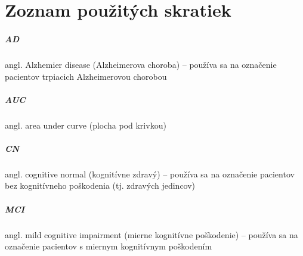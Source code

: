 \chapter*{Zoznam použitých skratiek}

\paragraph{AD} angl. Alzhemier disease (Alzheimerova choroba) -- používa sa na označenie pacientov trpiacich Alzheimerovou chorobou
\paragraph{AUC} angl. area under curve (plocha pod krivkou)
\paragraph{CN} angl. cognitive normal (kognitívne zdravý) -- používa sa na označenie pacientov bez kognitívneho poškodenia (tj. zdravých jedincov)
\paragraph{MCI} angl. mild cognitive impairment (mierne kognitívne poškodenie) -- používa sa na označenie pacientov s miernym kognitívnym poškodením
